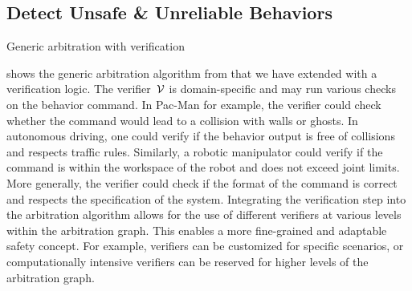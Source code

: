 \subsection{\textbf{Detect} Unsafe \& Unreliable Behaviors}
\begin{algorithm}

  \;
  \caption{Generic arbitration with verification \label{algo:verifying_arbitrator}}
\end{algorithm}

 shows the generic arbitration algorithm from \cite{lauerCognitiveConceptsAutonomous2010}
that we have extended with a verification logic.
The verifier~$\mathcal{V}$ is domain-specific and may run various checks on the behavior command.
In Pac-Man for example, the verifier could check whether the command would lead to a collision with walls or ghosts.
In autonomous driving, one could verify if the behavior output is free of collisions and respects traffic rules.
Similarly, a robotic manipulator could verify if the command is within the workspace of the robot and does not exceed joint limits.
More generally, the verifier could check if the format of the command is correct and respects the specification of the system.
Integrating the verification step into the arbitration algorithm allows for the use of different verifiers at various levels within the arbitration graph.
This enables a more fine-grained and adaptable safety concept.
For example, verifiers can be customized for specific scenarios, or computationally intensive verifiers can be reserved for higher levels of the arbitration graph.


